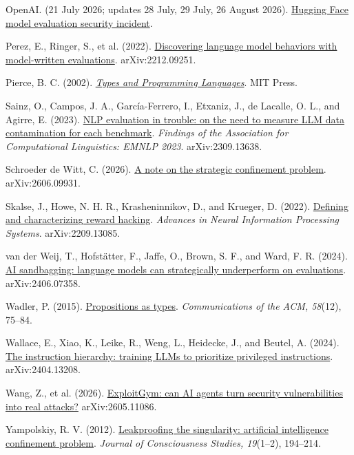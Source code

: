 \documentclass[11pt,letterpaper]{article}
\begin{document}
OpenAI. (21 July 2026; updates 28 July, 29 July, 26 August 2026). \href{https://openai.com/index/hugging-face-model-evaluation-security-incident/}{Hugging Face model evaluation security incident}.

Perez, E., Ringer, S., et al. (2022). \href{https://arxiv.org/abs/2212.09251}{Discovering language model behaviors with model-written evaluations}. arXiv:2212.09251.

Pierce, B. C. (2002). \textit{\href{https://mitpress.mit.edu/9780262162098/types-and-programming-languages/}{Types and Programming Languages}}. MIT Press.

Sainz, O., Campos, J. A., García-Ferrero, I., Etxaniz, J., de Lacalle, O. L., and Agirre, E. (2023). \href{https://arxiv.org/abs/2309.13638}{NLP evaluation in trouble: on the need to measure LLM data contamination for each benchmark}. \textit{Findings of the Association for Computational Linguistics: EMNLP 2023}. arXiv:2309.13638.

Schroeder de Witt, C. (2026). \href{https://arxiv.org/abs/2606.09931}{A note on the strategic confinement problem}. arXiv:2606.09931.

Skalse, J., Howe, N. H. R., Krasheninnikov, D., and Krueger, D. (2022). \href{https://arxiv.org/abs/2209.13085}{Defining and characterizing reward hacking}. \textit{Advances in Neural Information Processing Systems}. arXiv:2209.13085.

van der Weij, T., Hofstätter, F., Jaffe, O., Brown, S. F., and Ward, F. R. (2024). \href{https://arxiv.org/abs/2406.07358}{AI sandbagging: language models can strategically underperform on evaluations}. arXiv:2406.07358.

Wadler, P. (2015). \href{https://doi.org/10.1145/2699407}{Propositions as types}. \textit{Communications of the ACM, 58}(12), 75–84.

Wallace, E., Xiao, K., Leike, R., Weng, L., Heidecke, J., and Beutel, A. (2024). \href{https://arxiv.org/abs/2404.13208}{The instruction hierarchy: training LLMs to prioritize privileged instructions}. arXiv:2404.13208.

Wang, Z., et al. (2026). \href{https://arxiv.org/abs/2605.11086}{ExploitGym: can AI agents turn security vulnerabilities into real attacks?} arXiv:2605.11086.

Yampolskiy, R. V. (2012). \href{https://www.ingentaconnect.com/content/imp/jcs/2012/00000019/F0020001/art00014}{Leakproofing the singularity: artificial intelligence confinement problem}. \textit{Journal of Consciousness Studies, 19}(1–2), 194–214.
\end{document}
